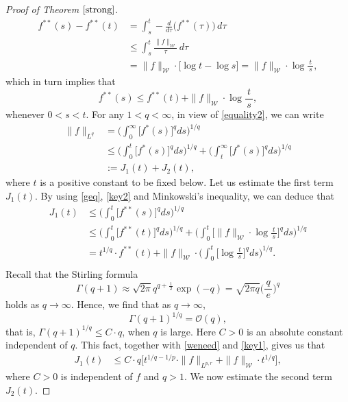 \documentclass{birkjour}
\theoremstyle{definition}
\theoremstyle{remark}
\numberwithin{equation}{section}
\begin{document}
\begin{proof}[Proof of Theorem $\ref{strong}$]
\begin{equation*}
\begin{split}
f^{**}(s)-f^{**}(t)&=\int_{s}^t-\frac{d}{d\tau}\big(f^{**}(\tau)\big)\,d\tau\\
&\leq\int_{s}^t\frac{\|f\|_{\mathcal{W}}}{\tau}\,d\tau\\
&=\|f\|_{\mathcal{W}}\cdot\big[\log t-\log s\big]=\|f\|_{\mathcal{W}}\cdot\log\frac{t}{\,s\,},
\end{split}
\end{equation*}
which in turn implies that
\begin{equation}\label{key2}
f^{**}(s)\leq f^{**}(t)+\|f\|_{\mathcal{W}}\cdot\log\frac{t}{\,s\,},
\end{equation}
whenever $0<s<t$. For any $1<q<\infty$, in view of \eqref{equality2}, we can write
\begin{equation*}
\begin{split}
\|f\|_{L^q}&=\bigg(\int_0^{\infty}\big[f^{*}(s)\big]^qds\bigg)^{1/q}\\
&\leq\bigg(\int_0^{t}\big[f^{*}(s)\big]^qds\bigg)^{1/q}+
\bigg(\int_{t}^{\infty}\big[f^{*}(s)\big]^qds\bigg)^{1/q}\\
&:=J_1(t)+J_2(t),
\end{split}
\end{equation*}
where $t$ is a positive constant to be fixed below. Let us estimate the first term $J_1(t)$. By using \eqref{geq}, \eqref{key2} and Minkowski's inequality, we can deduce that
\begin{equation*}
\begin{split}
J_1(t)&\leq\bigg(\int_0^{t}\big[f^{**}(s)\big]^qds\bigg)^{1/q}\\
&\leq\bigg(\int_0^{t}\big[f^{**}(t)\big]^qds\bigg)^{1/q}
+\bigg(\int_0^{t}\Big[\|f\|_{\mathcal{W}}\cdot\log\frac{t}{\,s\,}\Big]^qds\bigg)^{1/q}\\
&=t^{1/q}\cdot f^{**}(t)+\|f\|_{\mathcal{W}}
\cdot\bigg(\int_0^{t}\Big[\log\frac{t}{\,s\,}\Big]^qds\bigg)^{1/q}.\\
\end{split}
\end{equation*}
Recall that the Stirling formula
\begin{equation*}
\Gamma(q+1)\approx\sqrt{2\pi}q^{q+\frac{\,1\,}{2}}\exp(-q)=\sqrt{2\pi q}\Big(\frac{q}{\,e\,}\Big)^q
\end{equation*}
holds as $q\to\infty$. Hence, we find that as $q\to\infty$,
\begin{equation}\label{aso}
\Gamma(q+1)^{1/q}=\mathcal{O}(q),
\end{equation}
that is, $\Gamma(q+1)^{1/q}\leq C\cdot q$, when $q$ is large. Here $C>0$ is an absolute constant independent of $q$. This fact, together with \eqref{weneed} and \eqref{key1}, gives us that
\begin{equation*}
\begin{split}
J_1(t)&\leq C\cdot q\Big[t^{1/q-1/p}\cdot\|f\|_{L^{p,r}}+\|f\|_{\mathcal{W}}\cdot t^{1/q}\Big],
\end{split}
\end{equation*}
where $C>0$ is independent of $f$ and $q>1$. We now estimate the second term $J_2(t)$.


\end{proof}
\end{document}
